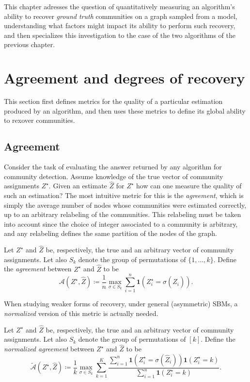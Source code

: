 \documentclass[../../main.tex]{subfiles} %
\begin{document}
This chapter adresses the question of quantitatively measuring an algorithm's 
ability to recover \textit{ground truth} communities on a graph sampled from a 
model, understanding what factors might impact its ability to perform such 
recovery, and then specializes this investigation to the case of the two 
algorithms of the previous chapter.

\section{Agreement and degrees of recovery}  %
This section first defines metrics for the quality of a particular estimation 
produced by an algorithm, and then uses these metrics to define its global 
ability to rexover communities.

\subsection{Agreement}
Consider the task of evaluating the answer returned by any algorithm for 
community detection. Assume knowledge of the true vector of community 
assignments \(Z^\star\). Given an estimate \(\hat Z\) for \(Z^\star\) how can 
one measure the quality of such an estimation? The most intuitive metric for 
this is the \textit{agreement}, which is simply the average number of nodes 
whose communities were estimated correctly, up to an arbitrary relabeling of 
the communities. This relabeling must be taken into account since the choice of 
integer associated to a community is arbitrary, and any relabeling defines the 
same partition of the nodes of the graph.
\begin{definition}[Agreement] \label{def:agreement}
	Let \(Z^\star\) and \(\hat Z\) be, respectively, the true and an 
	arbitrary vector of community assignments. Let also \(S_k\) denote the 
	group of permutations of \(\{1, \dots, k\}\). Define the \textit{agreement} 
	between 
	\(Z^\star\) and \(\hat Z\) to be
	\begin{equation} \label{eq:def-agreement}
		\mathcal A(Z^\star, \hat Z) \coloneqq 
		\frac{1}{n} \max_{\sigma \in S_k} 
		\sum_{i=1}^n \mathbf{1}(Z^\star_i = \sigma(\hat Z_i)).
	\end{equation}
\end{definition}

When studying weaker forms of recovery, under general (asymmetric) SBMs, a 
\textit{normalized} version of this metric is actually needed.
\begin{definition} \label{def:normalized-agreement}
	Let \(Z^\star\) and \(\hat Z\) be, respectively, the true and an 
	arbitrary vector of community assignments. Let also \(S_k\) denote the 
	group of permutations of \([k]\). Define the \textit{normalized agreement} 
	between \(Z^\star\) and \(\hat Z\) to be
	\begin{equation} \label{eq:def-normalized-agreement}
		\tilde{\mathcal{A}} (Z^\star, \hat Z) 
		\coloneqq 
		\frac{1}{k} \max_{\sigma \in S_k} 
		\sum_{k=1}^K \frac{\sum_{i=1}^n \mathbf{1}(Z^\star_i = \sigma( 
			\hat Z_i)) \mathbf{1} (Z^\star_i = k)}{\sum_{i=1}^n 
			\mathbf{1} (Z^\star_i = k)}.
	\end{equation}
\end{definition}
\end{document}
